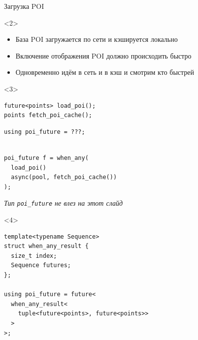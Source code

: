 \documentclass[aspectratio=169,hyperref={unicode},17pt]{beamer}
\begin{document}
\begin{frame}[fragile,t]{Загрузка POI}
\begin{onlyenv}<2>
\begin{itemize}
 \item База POI загружается по сети и кэшируется локально
 \item Включение отображения POI должно происходить быстро
 \item Одновременно идём в сеть и в кэш и смотрим кто быстрей
\end{itemize}
\end{onlyenv}
\begin{onlyenv}<3>
\begin{lstlisting}[style=cppcode,aboveskip=0pt,belowskip=0pt]
future<points> load_poi();
points fetch_poi_cache();
\end{lstlisting}
\begin{lstlisting}[style=cppcode,backgroundcolor=\color{gray!30},aboveskip=0pt,belowskip=0pt]
using poi_future = ???;
\end{lstlisting}
\begin{lstlisting}[style=cppcode,aboveskip=0pt,belowskip=0pt]

poi_future f = when_any(
  load_poi()
  async(pool, fetch_poi_cache())
);
\end{lstlisting}
\textit{\footnotesize{Тип \texttt{poi\_future} не влез на этот слайд}}
\end{onlyenv}
\begin{onlyenv}<4>
\begin{lstlisting}[style=cppcode]
template<typename Sequence>
struct when_any_result {
  size_t index;
  Sequence futures;
};

using poi_future = future<
  when_any_result<
    tuple<future<points>, future<points>>
  >
>;
\end{lstlisting}
\end{onlyenv}
\end{frame}
\end{document}
